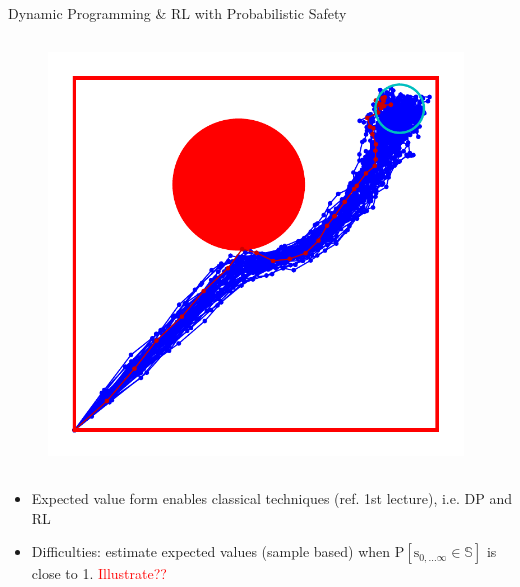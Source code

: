 \documentclass[lecture]{beamer}
\newcommand{\vect}[1]{\ensuremath{\boldsymbol{\mathrm{#1}}}}
\begin{document}
\begin{frame}{\normalsize Dynamic Programming \& RL with Probabilistic Safety}
\begin{columns}[t]
 \begin{figure}
   \includegraphics[width=0.98\textwidth]{Codes/BasicsSafety/ProbabilisticModel.pdf}%
  \end{figure}
\end{columns}
\begin{itemize}
\item Expected value form enables classical techniques (ref. 1st lecture), i.e. DP and RL
\item Difficulties: estimate expected values (sample based) when $\mathrm{P}\left[ \vect s_{0,\ldots\infty}\in \mathbb S\right]$ is close to 1. \textcolor{red}{Illustrate??}
\end{itemize}


\end{frame}
\end{document}
